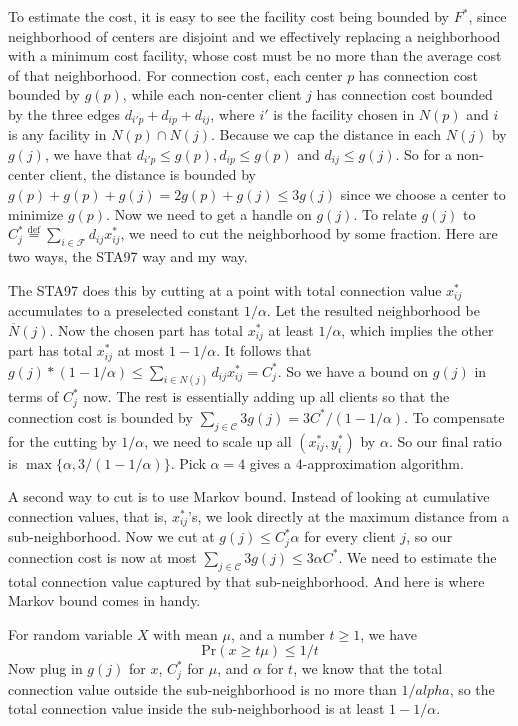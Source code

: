 \documentclass{article}
\newcommand{\fac}{\mathcal{F}}
\newcommand{\cli}{\mathcal{C}}
\newcommand{\mydef}{\text{def}}
\newcommand{\wbar}{\overline}
\begin{document}
To estimate the cost, it is easy to see the facility cost being
bounded by $F^\ast$, since neighborhood of centers are disjoint and we
effectively replacing a neighborhood with a minimum cost facility,
whose cost must be no more than the average cost of that
neighborhood. For connection cost, each center $p$ has connection cost
bounded by $g(p)$, while each non-center client $j$ has connection
cost bounded by the three edges $d_{i' p} + d_{ip} + d_{ij}$, where
$i'$ is the facility chosen in $N(p)$ and $i$ is any facility in
$N(p)\cap N(j)$. Because we cap the distance in each $N(j)$ by $g(j)$,
we have that $d_{i' p} \leq g(p), d_{ip} \leq g(p)$ and $d_{ij} \leq
g(j)$. So for a non-center client, the distance is bounded by $g(p) +
g(p) + g(j) = 2g(p) + g(j) \leq 3g(j)$ since we choose a center to
minimize $g(p)$. Now we need to get a handle on $g(j)$. To relate
$g(j)$ to $C_j^\ast \stackrel{\mydef}{=} \sum_{i\in \fac}
d_{ij}x_{ij}^\ast$, we need to cut the neighborhood by some
fraction. Here are two ways, the STA97 way and my way.

The STA97 does this by cutting at a point with total connection value
$x_{ij}^\ast$ accumulates to a preselected constant $1/\alpha$. Let
the resulted neighborhood be $\wbar N(j)$. Now the chosen part has
total $x_{ij}^\ast$ at least $1/\alpha$, which implies the other part
has total $x_{ij}^\ast$ at most $1-1/\alpha$. It follows that
$g(j)*(1-1/\alpha) \leq \sum_{i\in N(j)} d_{ij} x_{ij}^\ast =
C_j^\ast$. So we have a bound on $g(j)$ in terms of $C_j^\ast$
now. The rest is essentially adding up all clients so that the
connection cost is bounded by $\sum_{j\in\cli} 3g(j) =
3C^\ast/(1-1/\alpha)$. To compensate for the cutting by $1/\alpha$, we
need to scale up all $(x_{ij}^\ast, y_i^\ast)$ by $\alpha$. So our
final ratio is $\max\{\alpha, 3/(1-1/\alpha)\}$. Pick $\alpha=4$ gives
a $4$-approximation algorithm.

A second way to cut is to use Markov bound. Instead of looking at
cumulative connection values, that is, $x_{ij}^\ast$'s, we look
directly at the maximum distance from a sub-neighborhood. Now we cut
at $g(j) \leq C_j^\ast \alpha$ for every client $j$, so our connection
cost is now at most $\sum_{j\in\cli} 3g(j) \leq 3 \alpha C^\ast$. We
need to estimate the total connection value captured by that
sub-neighborhood. And here is where Markov bound comes in handy.

For random variable $X$ with mean $\mu$, and a number $t\geq 1$, we have
\begin{equation*}
  \text{Pr}(x \geq t\mu) \leq 1/t
\end{equation*}
Now plug in $g(j)$ for $x$, $C_j^\ast$ for $\mu$, and $\alpha$ for
$t$, we know that the total connection value outside the
sub-neighborhood is no more than $1/alpha$, so the total connection
value inside the sub-neighborhood is at least $1-1/\alpha$.
\end{document}
